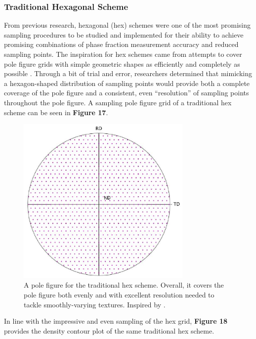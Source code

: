 \documentclass[10pt]{article}
\begin{document}
\subsubsection{Traditional Hexagonal Scheme}
From previous research, hexagonal (hex) schemes were one of the most promising sampling procedures to be studied 
and implemented for their ability to achieve promising combinations of phase fraction measurement accuracy
and reduced sampling points. The inspiration for hex schemes came from attempts to cover pole figure grids 
with simple geometric shapes 
as efficiently and completely as possible \cite{ref12}. Through a bit of trial and error, researchers determined that
mimicking a hexagon-shaped distribution of sampling points would provide both a complete coverage of the
pole figure and a consistent, even “resolution” of sampling points throughout the pole figure. A sampling pole figure grid
of a traditional hex scheme can be seen in \textbf{Figure 17}.

\begin{figure}[h]
    \centering
    \includegraphics[width=8.5cm]{fig17}
    \caption{\label{tab1}A pole figure for the traditional hex scheme. Overall, it covers the pole figure both evenly and with
    excellent resolution needed to tackle smoothly-varying textures. Inspired by \cite{ref13}.} 
    \end{figure}

In line with the impressive and even sampling of the hex grid, \textbf{Figure 18} provides the density contour plot of the same 
traditional hex scheme.
\end{document}
